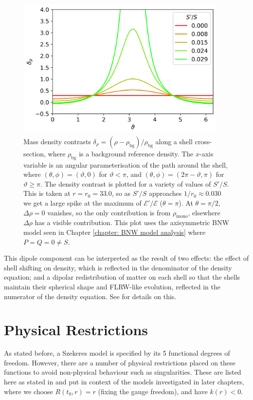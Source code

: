 \documentclass[a4paper,12pt]{report}
\begin{document}
\begin{figure}[t]
  \centering
  \includegraphics[width=105mm]{Density on shell varying dipole.png}
  \caption{Mass density contrasts $\delta_\rho = (\rho - \rho_\text{bg})/\rho_\text{bg}$ along a shell cross-section, where $\rho_\text{bg}$ is a background reference density. The $x$-axis variable is an angular parameterisation of the path around the shell, where $(\theta,\phi)=(\vartheta,0)$ for $\vartheta<\pi$, and $(\theta,\phi)=(2\pi-\vartheta,\pi)$ for $\vartheta \geq \pi$. The density contrast is plotted for a variety of values of $S'/S$.
  This is taken at $r=r_0=33.0$, so as $S'/S$ approaches $1/r_0 \approx 0.030$ we get a large spike at the maximum of $\mathcal{E}'/\mathcal{E}$ ($\theta=\pi$).
  At $\theta=\pi/2$, $\Delta\rho=0$ vanishes, so the only contribution is from $\rho_{\text{mono}}$, elsewhere $\Delta\rho$ has a visible contribution.
  This plot uses the axisymmetric BNW model seen in Chapter \ref{chapter: BNW model analysis} where $P=Q=0\neq S$.}
  \label{fig: szekeres - density on shell varying dipole}
\end{figure}

This dipole component can be interpreted as the result of two effects: the effect of shell shifting on density, which is reflected in the denominator of the density equation; and a dipolar redistribution of matter on each shell so that the shells maintain their spherical shape and FLRW-like evolution, reflected in the numerator of the density equation. See \cite{RN1} for details on this.


\section{Physical Restrictions}\label{section: szekeres - physical restrictions}
As stated before, a Szekeres model is specified by its 5 functional degrees of freedom. However, there are a number of physical restrictions placed on these functions to avoid non-physical behaviour such as singularities. These are listed here as stated in \cite{RN1,RN4} and put in context of the models investigated in later chapters, where we choose $R(t_0,r)=r$ (fixing the gauge freedom), and have $k(r)<0$.
\end{document}
